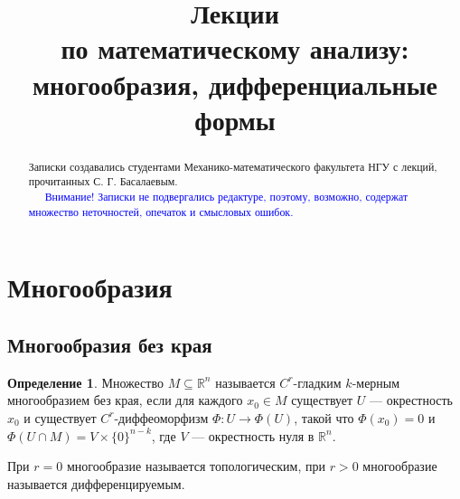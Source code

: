 \documentclass[a5paper]{article}
\newcounter{through}
\theoremstyle{plain}
\theoremstyle{definition}
\newtheorem{definition}[through]{Определение}
\numberwithin{through}{section}
\numberwithin{equation}{section}
\begin{document}
	
	
	\title{Лекции \\
	по математическому анализу:\\
	многообразия, дифференциальные формы}
	\maketitle
	
	\begin{abstract}
		Записки создавались студентами Механико-математического факультета НГУ 
		с лекций, прочитанных С. Г. Басалаевым.
		\\
	
		\textcolor{blue}{~~~Внимание! Записки не подвергались редактуре, поэтому, возможно, содержат множество неточностей, опечаток и смысловых ошибок.} 
		
	\end{abstract}

\clearpage
\tableofcontents

\clearpage


\section{Многообразия}

\subsection{Многообразия без края}

\begin{definition}
	\label{ManifoldNoBoundary}
	Множество $M \subseteq \mathbb{R}^n$ называется $C^r$-гладким $k$-мерным
	многообразием  без края, если для каждого $x_0 \in M$ существует $U$ --- окрестность
	$x_0$ и существует $ C^r$-диффеоморфизм $\Phi : U \to \Phi (U)$, такой что 
	$\Phi(x_0)=0$ и $\Phi(U \cap M) = V \times \{0\}^{n-k}$, где $V$ --- окрестность нуля в $\mathbb{R}^n$.
\end{definition}

При $r = 0$ многообразие называется топологическим, при $r > 0$ многообразие называется дифференцируемым.
\end{document}
